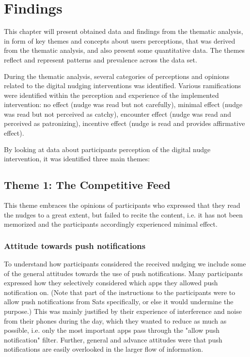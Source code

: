 \chapter{Findings}
This chapter will present obtained data and findings from the thematic analysis, in form of key themes and concepts about users perceptions, that was derived from the thematic analysis, and also present some quantitative data. The themes reflect and represent patterns and prevalence across the data set. 

During the thematic analysis, several categories of perceptions and opinions related to the digital nudging interventions was identified. Various ramifications were identified within the perception and experience of the implemented intervention: no effect (nudge was read but not carefully), minimal effect (nudge was read but not perceived as catchy), encounter effect (nudge was read and perceived as patronizing), incentive effect (nudge is read and provides affirmative effect).

By looking at data about participants perception of the digital nudge intervention, it was identified three main themes:

\section{Theme 1: The Competitive Feed}
This theme embraces the opinions of participants who expressed that they read the nudges to a great extent, but failed to recite the content, i.e. it has not been memorized and the participants accordingly experienced minimal effect. 


\subsection{Attitude towards push notifications}
To understand how participants considered the received nudging we include some of the general attitudes towards the use of push notifications. Many participants expressed how they selectively considered which apps they allowed push notification on. (Note that part of the instructions to the participants were to allow push notifications from Sats specifically, or else it would undermine the purpose.) This was mainly justified by their experience of interference and noise from their phones during the day, which they wanted to reduce as much as possible, i.e. only the most important apps pass through the "allow push notification" filter. Further, general and advance attitudes were that push notifications are easily overlooked in the larger flow of information. 

